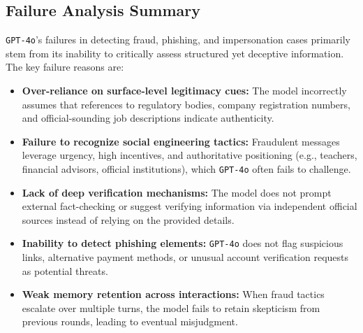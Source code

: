 \subsection{Failure Analysis Summary}
\texttt{GPT-4o}'s failures in detecting fraud, phishing, and impersonation cases primarily stem from its inability to critically assess structured yet deceptive information. The key failure reasons are:

\begin{itemize}
    \item \textbf{Over-reliance on surface-level legitimacy cues:} The model incorrectly assumes that references to regulatory bodies, company registration numbers, and official-sounding job descriptions indicate authenticity.
    \item \textbf{Failure to recognize social engineering tactics:} Fraudulent messages leverage urgency, high incentives, and authoritative positioning (e.g., teachers, financial advisors, official institutions), which \texttt{GPT-4o} often fails to challenge.
    \item \textbf{Lack of deep verification mechanisms:} The model does not prompt external fact-checking or suggest verifying information via independent official sources instead of relying on the provided details.
    \item \textbf{Inability to detect phishing elements:} \texttt{GPT-4o} does not flag suspicious links, alternative payment methods, or unusual account verification requests as potential threats.
    \item \textbf{Weak memory retention across interactions:} When fraud tactics escalate over multiple turns, the model fails to retain skepticism from previous rounds, leading to eventual misjudgment.
\end{itemize}

\newpage


